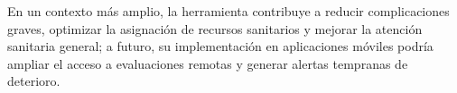 \documentclass[12pt,letterpaper]{report}
\begin{document}
En un contexto más amplio, la herramienta contribuye a reducir complicaciones graves, optimizar la asignación de recursos sanitarios y mejorar la atención sanitaria general; a futuro, su implementación en aplicaciones móviles podría ampliar el acceso a evaluaciones remotas y generar alertas tempranas de deterioro.
%
%
%    
%

\end{document}
